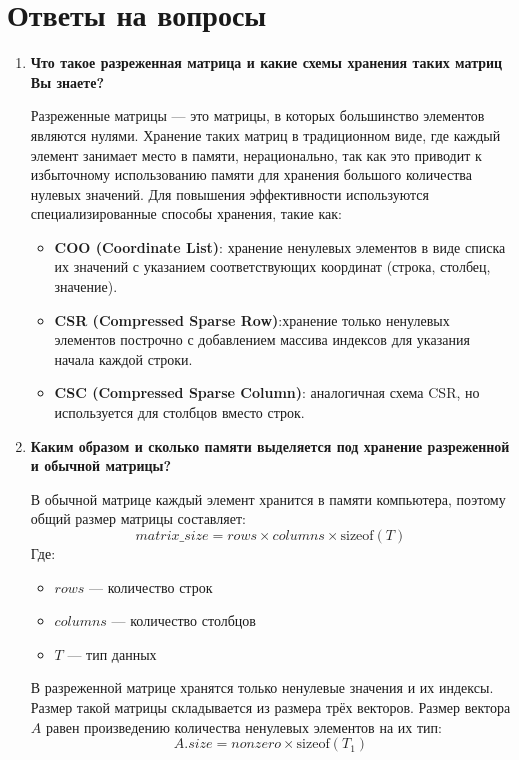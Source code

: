\section{Ответы на вопросы}
\begin{enumerate}
	\item \textbf{ Что такое разреженная матрица и какие схемы хранения таких матриц Вы знаете?}\par
	Разреженные матрицы — это матрицы, в которых большинство элементов являются нулями. Хранение таких матриц в традиционном виде, где каждый элемент занимает место в памяти, нерационально, так как это приводит к избыточному использованию памяти для хранения большого количества нулевых значений. Для повышения эффективности используются специализированные способы хранения, такие как:
	\begin{itemize}
		\item \textbf{COO (Coordinate List)}: хранение ненулевых элементов в виде списка их значений с указанием соответствующих координат (строка, столбец, значение).
		\item \textbf{CSR (Compressed Sparse Row)}:хранение только ненулевых элементов построчно с добавлением массива индексов для указания начала каждой строки.
		\item \textbf{CSC (Compressed Sparse Column)}: аналогичная схема CSR, но используется для столбцов вместо строк.
	\end{itemize}
	\item \textbf{Каким образом и сколько памяти выделяется под хранение разреженной и обычной матрицы?}\par
	В обычной матрице каждый элемент хранится в памяти компьютера, поэтому общий размер матрицы составляет:
	\begin{equation}
		matrix\_size = rows \times columns \times \text{sizeof}(T)
		\label{eq:matrix_size}
	\end{equation}
	Где: 
	\begin{itemize} 
		\item $rows$ — количество строк 
		\item $columns$ — количество столбцов
		\item $T$ — тип данных
	\end{itemize}
	В разреженной матрице хранятся только ненулевые значения и их индексы. Размер такой матрицы складывается из размера трёх векторов. Размер вектора $A$ равен произведению количества ненулевых элементов на их тип:
	\begin{equation}
		A.size = nonzero \times \text{sizeof}(T_1)

\end{equation}
\end{enumerate}
